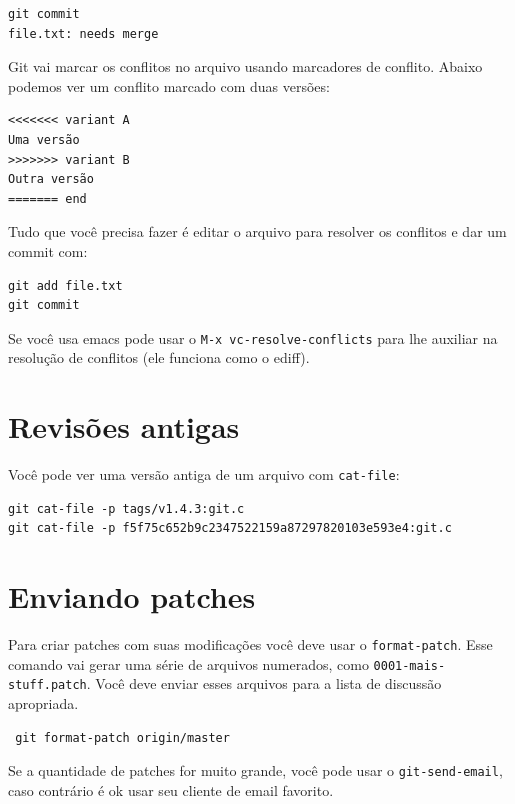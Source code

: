 \documentclass[12pt,brazil]{book}
\begin{document}
\begin{verbatim}
git commit
file.txt: needs merge
\end{verbatim}

Git vai marcar os conflitos no arquivo usando marcadores de conflito.
Abaixo podemos ver um conflito marcado com duas versões:

\begin{verbatim}
<<<<<<< variant A
Uma versão
>>>>>>> variant B
Outra versão
======= end
\end{verbatim}

Tudo que você precisa fazer é editar o arquivo para resolver os
conflitos e dar um commit com:

\begin{verbatim}
git add file.txt
git commit
\end{verbatim}

Se você usa emacs pode usar o \texttt{M-x vc-resolve-conflicts} para
lhe auxiliar na resolução de conflitos (ele funciona como o ediff).

\section{Revisões antigas}
\label{sec:revisoes-antigas}

Você pode ver uma versão antiga de um arquivo com \texttt{cat-file}:

\begin{verbatim}
git cat-file -p tags/v1.4.3:git.c
git cat-file -p f5f75c652b9c2347522159a87297820103e593e4:git.c
\end{verbatim}

\section{Enviando patches}
\label{sec:enviando-patches}

Para criar patches com suas modificações você deve usar o
\texttt{format-patch}. Esse comando vai gerar uma série de arquivos
numerados, como \texttt{0001-mais-stuff.patch}. Você deve enviar esses
arquivos para a lista de discussão apropriada.

\begin{verbatim}
 git format-patch origin/master
\end{verbatim}

Se a quantidade de patches for muito grande, você pode usar o
\texttt{git-send-email}, caso contrário é ok usar seu cliente de email
favorito.
\end{document}
